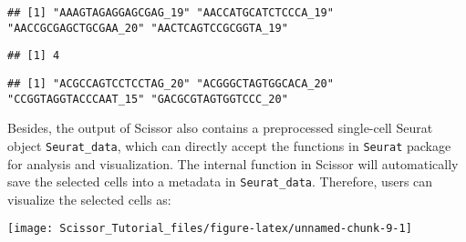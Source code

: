 \documentclass[]{article}
\newenvironment{Shaded}{\begin{snugshade}}{\end{snugshade}}
\newcommand{\KeywordTok}[1]{\textcolor[rgb]{0.13,0.29,0.53}{\textbf{#1}}}
\newcommand{\DataTypeTok}[1]{\textcolor[rgb]{0.13,0.29,0.53}{#1}}
\newcommand{\DecValTok}[1]{\textcolor[rgb]{0.00,0.00,0.81}{#1}}
\newcommand{\StringTok}[1]{\textcolor[rgb]{0.31,0.60,0.02}{#1}}
\newcommand{\OperatorTok}[1]{\textcolor[rgb]{0.81,0.36,0.00}{\textbf{#1}}}
\newcommand{\NormalTok}[1]{#1}
\begin{document}
\begin{verbatim}
## [1] "AAAGTAGAGGAGCGAG_19" "AACCATGCATCTCCCA_19" "AACCGCGAGCTGCGAA_20" "AACTCAGTCCGCGGTA_19"
\end{verbatim}

\begin{Shaded}
\end{Shaded}

\begin{verbatim}
## [1] 4
\end{verbatim}

\begin{Shaded}
\end{Shaded}

\begin{verbatim}
## [1] "ACGCCAGTCCTCCTAG_20" "ACGGGCTAGTGGCACA_20" "CCGGTAGGTACCCAAT_15" "GACGCGTAGTGGTCCC_20"
\end{verbatim}

Besides, the output of Scissor also contains a preprocessed single-cell
Seurat object \texttt{Seurat\_data}, which can directly accept the
functions in \texttt{Seurat} package for analysis and visualization. The
internal function in Scissor will automatically save the selected cells
into a metadata in \texttt{Seurat\_data}. Therefore, users can visualize
the selected cells as:

\begin{Shaded}
\end{Shaded}

\begin{center}\texttt{[image: Scissor\_Tutorial\_files/figure-latex/unnamed-chunk-9-1]} \end{center}
\end{document}
